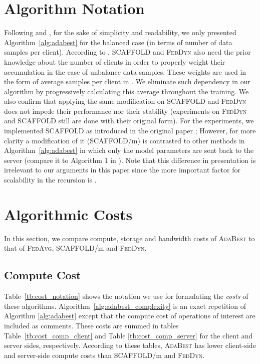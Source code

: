 \documentclass[runningheads]{llncs}
\def\algref#1{Algorithm~\ref{#1}}
\newcommand{\fedavg}{\textsc{FedAvg}\xspace}
\newcommand{\scaffold}{\textsc{SCAFFOLD}\xspace}
\newcommand{\feddyn}{\textsc{FedDyn}\xspace}
\newcommand{\ours}{\textsc{AdaBest}\xspace}
\begin{document}
\section{Algorithm Notation}

Following \cite{karimireddy2020scaffold} and \cite{acar2021federated}, for the sake of
simplicity and readability, we only presented \algref{alg:adabest} for the balanced
case (in terms of number of data samples per client).
According to \cite{feddynacar}, \scaffold and \feddyn also need the prior
knowledge about the number of clients in order to properly weight their 
accumulation in the case of unbalance data samples.
These weights are used in the form of average samples per client in \cite{feddynacar}.
We eliminate such dependency in our algorithm by progressively calculating this average
throughout the training.
We also confirm that applying the same modification on \scaffold and \feddyn
does not impede their performance nor their stability (experiments on \feddyn and
\scaffold still are done with their original form).
For the experiments, we implemented \scaffold as introduced in the original paper
\cite{karimireddy2020scaffold}; However, for more clarity a modification of it
(\scaffold/m) is contrasted to other methods in \algref{alg:adabest} in which
only the model parameters are sent back to the server (compare it to Algorithm 1 in \cite{karimireddy2020scaffold}).
Note that this difference in presentation is irrelevant to our arguments in this
paper since the more important factor for scalability in the recursion is
.

\section{Algorithmic Costs}
In this section, we compare compute, storage and bandwidth costs of \ours to
that of \fedavg, \scaffold/m and \feddyn. 


\subsection{Compute Cost}
Table~\ref{tb:cost_notation} shows the notation we use for formulating the
\textit{costs} of these algorithms.
Algorithm~\ref{alg:adabest_complexity} is an exact repetition of Algorithm
\ref{alg:adabest} except that the compute cost of operations of interest are included
as comments.
These costs are summed in tables Table~\ref{tb:cost_comp_client} and Table
\ref{tb:cost_comp_server} for the client and server sides, respectively.
According to these tables, \ours has lower client-side and server-side compute
costs than \scaffold/m and \feddyn. 
\end{document}
